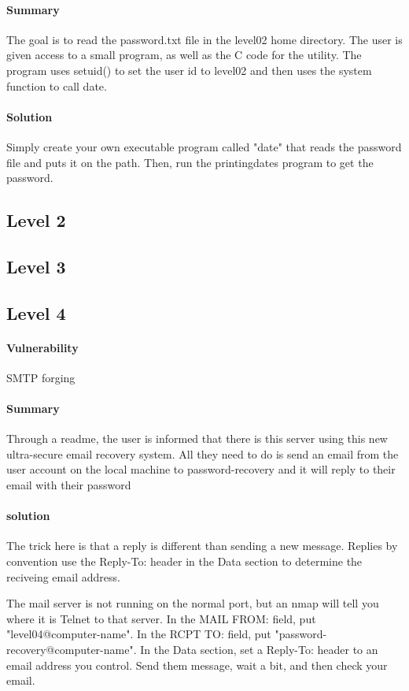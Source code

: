\documentclass[12pt]{article}
\begin{document}
\paragraph{Summary} The goal is to read the password.txt file in the level02
home directory. The user is given access to a small program, as well as the
C code for the utility. The program uses setuid() to set the user id to level02 and then uses the system
function to call date.
\paragraph{Solution} Simply create your own executable program called "date"
that reads the password file and puts it on the path. Then, run the
printingdates program to get the password.

\subsection{Level 2}

\subsection{Level 3}

\subsection{Level 4}
\paragraph{Vulnerability} SMTP forging
\paragraph{Summary} Through a readme, the user is informed that there is this
server using this new ultra-secure email recovery system. All they need to do
is send an email from the user account on the local machine to
password-recovery and it will reply to their email with their password 
\paragraph{solution} The trick here is that a reply is different than sending a
new message. Replies by convention use the Reply-To: header in the Data section
to determine the reciveing email address. 

The mail server is not running on the normal port, but an
nmap will tell you where it is Telnet to that server. In the MAIL FROM: field,
put "level04@computer-name". In the RCPT TO: field, put
"password-recovery@computer-name". In the Data section, set a Reply-To:
header to an email address you control. Send them message, wait a bit, and then
check your email. 
\end{document}

